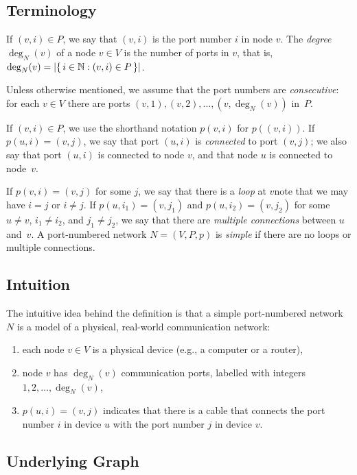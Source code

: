 \subsection{Terminology}

If $(v,i) \in P$, we say that $(v,i)$ is the port number $i$ in node $v$. The \emph{degree} $\deg_N(v)$ of a node $v \in V$ is the number of ports in $v$, that is, $\deg_N(v) = |\{\,  i \in \mathbb{N} : (v,i) \in P  \,\}|$.

Unless otherwise mentioned, we assume that the port numbers are \emph{consecutive}: for each $v \in V$ there are ports $(v,1),\allowbreak (v,2),\allowbreak \dotsc,\allowbreak (v,\deg_N(v))$ in~$P$.

If $(v,i) \in P$, we use the shorthand notation $p(v,i)$ for $p((v,i))$. If $p(u,i) = (v,j)$, we say that port $(u,i)$ is \emph{connected} to port $(v,j)$; we also say that port $(u,i)$ is connected to node $v$, and that node $u$ is connected to node~$v$.

If $p(v,i) = (v,j)$ for some $j$, we say that there is a \emph{loop} at $v$\mydash note that we may have $i = j$ or $i \ne j$. If $p(u,i_1) = (v,j_1)$ and $p(u,i_2) = (v,j_2)$ for some $u \ne v$, $i_1 \ne i_2$, and $j_1 \ne j_2$, we say that there are \emph{multiple connections} between $u$ and~$v$. A port-numbered network $N = (V,P,p)$ is \emph{simple} if there are no loops or multiple connections. 

\subsection{Intuition}

The intuitive idea behind the definition is that a simple port-numbered network $N$ is a model of a physical, real-world communication network:
\begin{enumerate}
    \item each node $v \in V$ is a physical device (e.g., a computer or a router),
    \item node $v$ has $\deg_N(v)$ communication ports, labelled with integers $1,2,\dotsc,\allowbreak\deg_N(v)$,
    \item $p(u,i) = (v,j)$ indicates that there is a cable that connects the port number $i$ in device $u$ with the port number $j$ in device $v$.
\end{enumerate}

\subsection{Underlying Graph}

